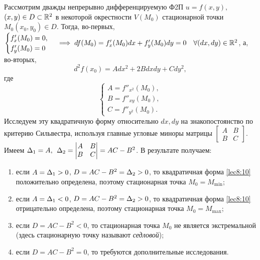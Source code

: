 \documentclass[../../main.tex]{subfiles}
\begin{document}
    \begin{iex}
        Рассмотрим дважды непрерывно дифференцируемую Ф2П $u = f(x, y), \;$
        $(x, y) \in D \subset \mathbb{R}^2$ в некоторой окрестности $V(M_0)$
        стационарной точки $M_0 (x_0, y_0) \in D$. Тогда, во-первых,
        $\begin{cases}
            f'_x(M_0) = 0, \\
            f'_y(M_0) = 0
        \end{cases}
        \implies df(M_0) = f'_x(M_0)dx + f'_y(M_0)dy = 0 
        \quad \forall(dx, dy)
        \in \mathbb{R}^2$, а, во-вторых,
        \begin{equation}
            d^2f(x_0) = Adx^2 + 2Bdxdy + Cdy^2,
            \label{lec8:10}
        \end{equation}
        где
        \[\begin{cases}
            A = f''_{x^2}(M_0), \\
            B = f''_{xy}(M_0), \\
            C = f''_{y^2}(M_0).
        \end{cases}\]
        Исследуем эту квадратичную форму относительно $dx, dy$ на
        знакопостоянство по критерию Сильвестра, используя главные угловые
        миноры матрицы
        $\begin{bmatrix}
            A & B \\
            B & C
        \end{bmatrix}$.
        Имеем $\Delta_1 = A,\:\: \Delta_2 =
        \begin{vmatrix}
            A & B \\
            B & C
        \end{vmatrix}
        = AC - B^2$. В результате получаем:
        \begin{enumerate}[label=\arabic*)]
            \item если $A = \Delta_1 > 0$, $D = AC-B^2 = \Delta_2 > 0$, то
            квадратичная форма \eqref{lec8:10} положительно определена,
            поэтому стационарная точка $M_0 = M_{\min}$;
            \item если $A = \Delta_1 < 0$, $D = AC-B^2 = \Delta_2 > 0$, то
            квадратичная форма \eqref{lec8:10} отрицательно определена,
            поэтому стационарная точка $M_0 = M_{\max}$;
            \item если $D = AC - B^2 < 0$, то стационарная точка $M_0$ не
            является экстремальной (здесь стационарную точку называют \emph{седловой});
            \item если $D = AC - B^2 = 0$, то требуются дополнительные
            исследования.
        \end{enumerate}
    \end{iex}
\end{document}
